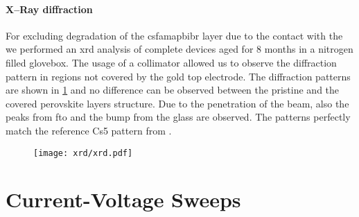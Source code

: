 	\paragraph{X--Ray diffraction}
For excluding degradation of the \gls{csfamapbibr} layer due to the contact with the  we performed an \gls{xrd} analysis of complete devices aged for 8 months in a nitrogen filled glovebox.
The usage of a collimator allowed us to observe the diffraction pattern in regions not covered by the gold top electrode.
The diffraction patterns are shown in \cref{fig:tae_xrd} and no difference can be observed between the pristine and the covered perovskite layers structure.
Due to the penetration of the beam, also the peaks from \gls{fto} and the bump from the glass are observed.
The patterns perfectly match the reference Cs5 pattern from .




	\begin{figure}
		\centering
		\texttt{[image: xrd/xrd.pdf]}
		\label{fig:tae_xrd}
	\end{figure}


\section{Current-Voltage Sweeps}

